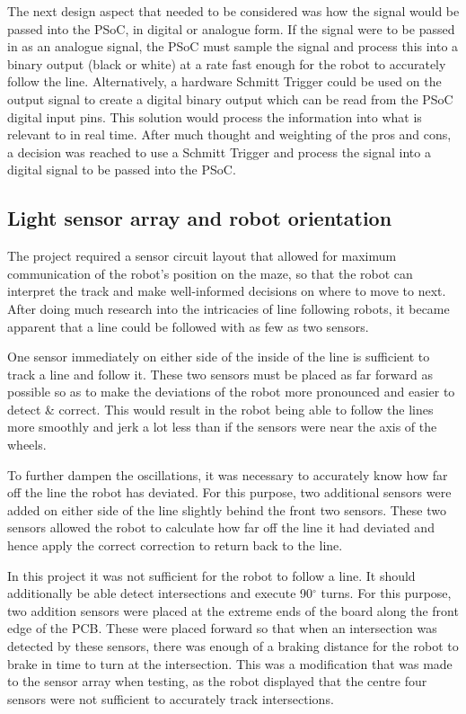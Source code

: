 \documentclass{article}
\begin{document}
The next design aspect that needed to be considered was how the signal would be passed into the PSoC, in digital or analogue form. If the signal were to be passed in as an analogue signal, the PSoC must sample the signal and process this into a binary output (black or white) at a rate fast enough for the robot to accurately follow the line. Alternatively, a hardware Schmitt Trigger could be used on the output signal to create a digital binary output which can be read from the PSoC digital input pins. This solution would process the information into what is relevant to in real time. After much thought and weighting of the pros and cons, a decision was reached to use a Schmitt Trigger and process the signal into a digital signal to be passed into the PSoC.

\subsection{Light sensor array and robot orientation}

The project required a sensor circuit layout that allowed for maximum communication of the robot’s position on the maze, so that the robot can interpret the track and make well-informed decisions on where to move to next. After doing much research into the intricacies of line following robots, it became apparent that a line could be followed with as few as two sensors.

One sensor immediately on either side of the inside of the line is sufficient to track a line and follow it. These two sensors must be placed as far forward as possible so as to make the deviations of the robot more pronounced and easier to detect \& correct. This would result in the robot being able to follow the lines more smoothly and jerk a lot less than if the sensors were near the axis of the wheels. 

To further dampen the oscillations, it was necessary to accurately know how far off the line the robot has deviated. For this purpose, two additional sensors were added on either side of the line slightly behind the front two sensors. These two sensors allowed the robot to calculate how far off the line it had deviated and hence apply the correct correction to return back to the line. 

In this project it was not sufficient for the robot to follow a line. It should additionally be able detect intersections and execute 90$^{\circ}$ turns. For this purpose, two addition sensors were placed at the extreme ends of the board along the front edge of the PCB. These were placed forward so that when an intersection was detected by these sensors, there was enough of a braking distance for the robot to brake in time to turn at the intersection. This was a modification that was made to the sensor array when testing, as the robot displayed that the centre four sensors were not sufficient to accurately track intersections.
\end{document}
